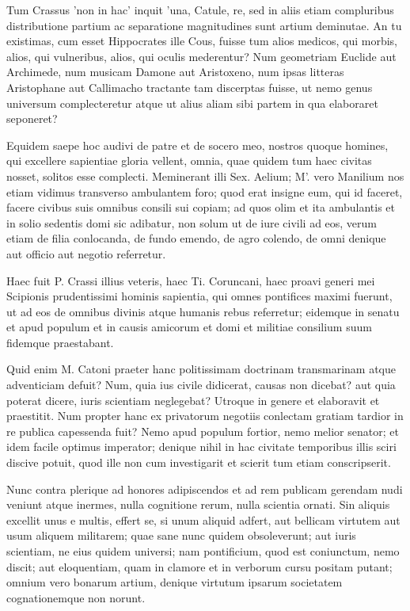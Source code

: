  Tum Crassus 'non in hac' inquit 'una, Catule, re, sed in aliis etiam compluribus distributione partium ac separatione magnitudines sunt artium deminutae. An tu existimas, cum esset Hippocrates ille Cous, fuisse tum alios medicos, qui morbis, alios, qui vulneribus, alios, qui oculis mederentur? Num geometriam Euclide aut Archimede, num musicam Damone aut Aristoxeno, num ipsas litteras Aristophane aut Callimacho tractante tam discerptas fuisse, ut nemo genus universum complecteretur atque ut alius aliam sibi partem in qua elaboraret seponeret?

 Equidem saepe hoc audivi de patre et de socero meo, nostros quoque homines, qui excellere sapientiae gloria vellent, omnia, quae quidem tum haec civitas nosset, solitos esse complecti. Meminerant illi Sex. Aelium; M'. vero Manilium nos etiam vidimus transverso ambulantem foro; quod erat insigne eum, qui id faceret, facere civibus suis omnibus consili sui copiam; ad quos olim et ita ambulantis et in solio sedentis domi sic adibatur, non solum ut de iure civili ad eos, verum etiam de filia conlocanda, de fundo emendo, de agro colendo, de omni denique aut officio aut negotio referretur.

 Haec fuit P. Crassi illius veteris, haec Ti. Coruncani, haec proavi generi mei Scipionis prudentissimi hominis sapientia, qui omnes pontifices maximi fuerunt, ut ad eos de omnibus divinis atque humanis rebus referretur; eidemque in senatu et apud populum et in causis amicorum et domi et militiae consilium suum fidemque praestabant.

 Quid enim M. Catoni praeter hanc politissimam doctrinam transmarinam atque adventiciam defuit? Num, quia ius civile didicerat, causas non dicebat? aut quia poterat dicere, iuris scientiam neglegebat? Utroque in genere et elaboravit et praestitit. Num propter hanc ex privatorum negotiis conlectam gratiam tardior in re publica capessenda fuit? Nemo apud populum fortior, nemo melior senator; et idem facile optimus imperator; denique nihil in hac civitate temporibus illis sciri discive potuit, quod ille non cum investigarit et scierit tum etiam conscripserit.

 Nunc contra plerique ad honores adipiscendos et ad rem publicam gerendam nudi veniunt atque inermes, nulla cognitione rerum, nulla scientia ornati. Sin aliquis excellit unus e multis, effert se, si unum aliquid adfert, aut bellicam virtutem aut usum aliquem militarem; quae sane nunc quidem obsoleverunt; aut iuris scientiam, ne eius quidem universi; nam pontificium, quod est coniunctum, nemo discit; aut eloquentiam, quam in clamore et in verborum cursu positam putant; omnium vero bonarum artium, denique virtutum ipsarum societatem cognationemque non norunt.

